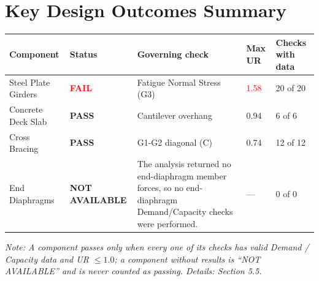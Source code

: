 \documentclass[12pt,a4paper]{report}
\numberwithin{table}{chapter}
\numberwithin{figure}{chapter}
\begin{document}
\vspace{1em}

\section*{Key Design Outcomes Summary}
\label{sec:key-outcomes}

\noindent\begin{tabular}{|L{3.01cm}|C{2.12cm}|L{5.32cm}|C{1.24cm}|C{1.95cm}|}
\hline
{}\textbf{Component} & \textbf{Status} & \textbf{Governing check} & \textbf{Max UR} & \textbf{Checks with data} \\
\hline
Steel Plate Girders & \textcolor{red}{\textbf{FAIL}} & Fatigue Normal Stress (G3) & \textcolor{red}{1.58} & 20 of 20 \\
\hline
Concrete Deck Slab & \textbf{PASS} & Cantilever overhang & 0.94 & 6 of 6 \\
\hline
Cross Bracing & \textbf{PASS} & G1-G2 diagonal (C) & 0.74 & 12 of 12 \\
\hline
End Diaphragms & \textbf{NOT AVAILABLE} & The analysis returned no end-diaphragm member forces, so no end-diaphragm Demand/Capacity checks were performed. & --- & 0 of 0 \\
\hline
\end{tabular}

\vspace{0.4em}
\noindent\textit{Note: A component passes only when every one of its checks has valid Demand / Capacity data and UR $\leq 1.0$; a component without results is ``NOT AVAILABLE'' and is never counted as passing. Details: Section 5.5.}
\end{document}
